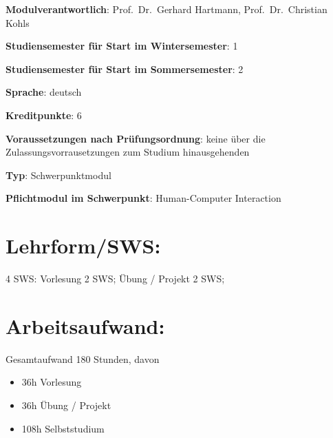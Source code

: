 \begin{modulHead}
\textbf{Modulverantwortlich}: Prof.~Dr.~Gerhard
Hartmann, Prof.~Dr.~Christian
Kohls
\end{modulHead}
\begin{modulHead}
\textbf{Studiensemester für
Start im Wintersemester}:
1
\end{modulHead}
\begin{modulHead}
\textbf{Studiensemester für Start
im Sommersemester}:
2
\end{modulHead}
\begin{modulHead}
\textbf{Sprache}:
deutsch
\end{modulHead}
\begin{modulHead}
\textbf{Kreditpunkte}:
6
\end{modulHead}
\begin{modulHead}
\textbf{Voraussetzungen nach
Prüfungsordnung}: keine über die Zulassungsvorrausetzungen zum Studium
hinausgehenden
\end{modulHead}
\begin{modulHead}
\textbf{Typ}:
Schwerpunktmodul
\end{modulHead}
\begin{modulHead}
\textbf{Pflichtmodul
im Schwerpunkt}: Human-Computer Interaction
\end{modulHead}


\section*{Lehrform/SWS:\label{/mi-2017/modulbeschreibungen-master/MA_HCI_Design_Methodologies}}\label{lehrformswspathlabelmi-2017modulbeschreibungen-mastermaux5fhciux5fdesignux5fmethodologies}

4 SWS: Vorlesung 2 SWS; Übung / Projekt 2 SWS;

\section*{Arbeitsaufwand:\label{/mi-2017/modulbeschreibungen-master/MA_HCI_Design_Methodologies}}\label{arbeitsaufwandpathlabelmi-2017modulbeschreibungen-mastermaux5fhciux5fdesignux5fmethodologies}

Gesamtaufwand 180 Stunden, davon

\begin{itemize}
\tightlist
\item
  36h Vorlesung
\item
  36h Übung / Projekt
\item
  108h Selbststudium
\end{itemize}

